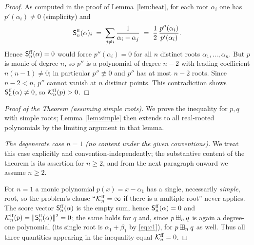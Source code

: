 \begin{proof}
As computed in the proof of Lemma~\ref{lem:heat}, for each root $\alpha_i$ one has
$p'(\alpha_i)\ne0$ (simplicity) and
\[
\mathsf{S}^{\mathrm{ff}}_n(\alpha)_i\;=\;\sum_{j\ne i}\frac{1}{\alpha_i-\alpha_j}
\;=\;\frac{1}{2}\,\frac{p''(\alpha_i)}{p'(\alpha_i)} .
\]
Hence $\mathsf{S}^{\mathrm{ff}}_n(\alpha)=0$ would force $p''(\alpha_i)=0$ for all $n$ distinct
roots $\alpha_1,\dots,\alpha_n$. But $p$ is monic of degree $n$, so $p''$ is a
polynomial of degree $n-2$ with leading coefficient $n(n-1)\ne0$; in particular
$p''\not\equiv0$ and $p''$ has at most $n-2$ roots. Since $n-2<n$, $p''$ cannot
vanish at $n$ distinct points. This contradiction shows $\mathsf{S}^{\mathrm{ff}}_n(\alpha)\ne0$,
so $\mathcal{K}^{\mathrm{ff}}_n(p)>0$.
\end{proof}

\begin{proof}[Proof of the Theorem (assuming simple roots)]
We prove the inequality for $p,q$ with simple roots; Lemma~\ref{lem:simple} then
extends to all real-rooted polynomials by the limiting argument in that lemma.

\smallskip\noindent\textit{The degenerate case $n=1$ (no content under the given
conventions).} We treat this case explicitly and convention-independently; the
substantive content of the theorem is its assertion for $n\ge2$, and from the next
paragraph onward we assume $n\ge2$.

For $n=1$ a monic polynomial $p(x)=x-\alpha_1$ has a single, necessarily
\emph{simple}, root, so the problem's clause ``$\mathcal{K}^{\mathrm{ff}}_n=\infty$ if there is a
multiple root'' never applies. The score vector $\mathsf{S}^{\mathrm{ff}}_n(\alpha)$ is the empty
sum, hence $\mathsf{S}^{\mathrm{ff}}_n(\alpha)=0$ and $\mathcal{K}^{\mathrm{ff}}_n(p)=\|\mathsf{S}^{\mathrm{ff}}_n(\alpha)\|^2=0$;
the same holds for $q$ and, since $p\boxplus_n q$ is again a degree-one polynomial
(its single root is $\alpha_1+\beta_1$ by \eqref{eq:c1}), for $p\boxplus_n q$ as well.
Thus all three quantities appearing in the inequality equal $\mathcal{K}^{\mathrm{ff}}_n=0$.


\end{proof}
